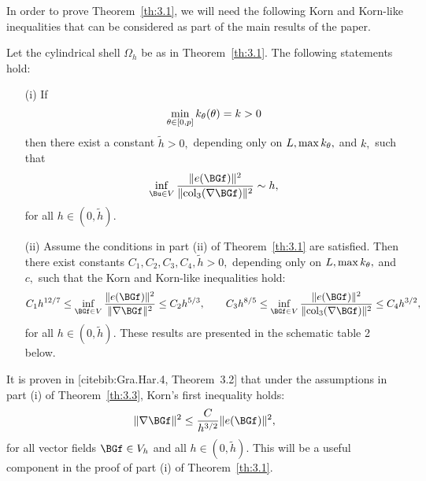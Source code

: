 In order to prove Theorem~\ref{th:3.1}, we will need the following Korn and Korn-like inequalities that can be considered as part of the main results of the paper. 

\begin{theorem}
\label{th:3.3}
Let the cylindrical shell $\Omega_h$ be as in Theorem~\ref{th:3.1}. 
The following statements hold:
\begin{itemize}
\item[(i)] If 
$$\min_{\theta\in[0,p]}k_\theta(\theta)=k>0$$
then there exist a constant $\tilde h>0,$ depending only on $L, \max k_\theta,$ and $k,$ such that
\begin{equation}
\label{3.5}
\inf_{\Bu\in V}\frac{\|e(\BGf)\|^2}{\|\mathrm{col}_3(\nabla\BGf)\|^2}\sim h,
\end{equation}
for all $h\in (0,\tilde h).$
\item[(ii)] Assume the conditions in part (ii) of Theorem~\ref{th:3.1} are satisfied. Then there exist constants $C_1,C_2,C_3,C_4,\tilde h>0,$ depending only on 
$L,\max k_\theta,$ and $c,$ such that the Korn and Korn-like inequalities hold:
\begin{equation}
\label{3.7}
C_1h^{12/7}\leq \inf_{\BGf\in V}\frac{\|e(\BGf)\|^2}{\|\nabla \BGf\|^2}\leq C_2h^{5/3},\quad 
\quad  C_3h^{8/5}\leq \inf_{\BGf\in V}\frac{\|e(\BGf)\|^2}{\|\mathrm{col}_3(\nabla\BGf)\|^2}\leq C_4h^{3/2},
\end{equation}
for all $h\in (0,\tilde h).$ These results are presented in the schematic table 2 below.
\end{itemize}

\end{theorem}

\begin{remark}
\label{rem:3.4}
It is proven in [cite{bib:Gra.Har.4}, Theorem~3.2] that under the assumptions in part (i) of Theorem~\ref{th:3.3}, Korn's first inequality holds:
\begin{equation}
\label{3.8}
\|\nabla\BGf\|^2\leq\frac{C}{h^{3/2}}\|e(\BGf)\|^2,
\end{equation}
for all vector fields $\BGf\in V_h$ and all $h\in (0,\tilde h).$ This will be a useful component in the proof of part (i) of Theorem~\ref{th:3.1}.
\end{remark}







